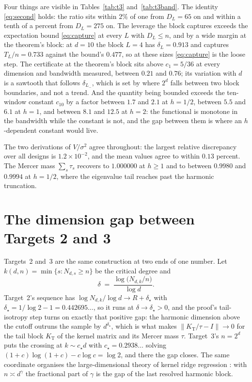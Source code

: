 \documentclass[11pt]{article}
\theoremstyle{definition}
\newcommand{\Kt}{K_{\mathrm{T}}}
\newcommand{\numCertMax}{0.76}
\newcommand{\numCertMin}{0.21}
\newcommand{\numRatioMaxHalf}{2.1}
\newcommand{\numRatioMaxOne}{6.1}
\newcommand{\numRatioMaxTwo}{12.5}
\newcommand{\numRatioMinHalf}{1.7}
\newcommand{\numRatioMinOne}{5.5}
\newcommand{\numRatioMinTwo}{8.1}
\newcommand{\numTauHalfMax}{0.9994}
\newcommand{\numTauHalfMin}{0.9980}
\newcommand{\numVgapMax}{1.2\times10^{-2}}
\newcommand{\numVmeanGapMax}{0.13}
\begin{document}
Four things are visible in Tables~\ref{tab:t3} and~\ref{tab:t3band}. The identity \eqref{eq:second}
holds: the ratio sits within $2\%$ of one from $D_L=65$ on and within a tenth of a percent from
$D_L=275$ on. The leverage the block captures exceeds the expectation bound \eqref{eq:capture} at
every $L$ with $D_L\le n$, and by a wide margin at the theorem's block: at $d=10$ the block $L=4$ has
$\delta_L=0.913$ and captures $T_L/n=0.733$ against the bound's $0.477$, so at these sizes
\eqref{eq:capture} is the loose step. The certificate at the theorem's block sits above $c_1=5/36$
at every dimension and bandwidth measured, between $\numCertMin$ and $\numCertMax$; its variation
with $d$ is a sawtooth that follows $\delta_{L_-}$, which is set by where $2^d$ falls between two
block boundaries, and not a trend. And the quantity being bounded exceeds the ten-window constant
$c_{10}$ by a factor between $\numRatioMinHalf$ and $\numRatioMaxHalf$ at $h=1/2$, between
$\numRatioMinOne$ and $\numRatioMaxOne$ at $h=1$, and between $\numRatioMinTwo$ and
$\numRatioMaxTwo$ at $h=2$: the functional is monotone in the bandwidth while the constant is not,
and the gap between them is where an $h$-dependent constant would live.

The two derivations of $V/\sigma^2$ agree throughout: the largest relative discrepancy over all
designs is $\numVgapMax$, and the mean values agree to within $\numVmeanGapMax$ percent. The Mercer mass
$\sum_s\tau_s$ recovers to $1.000000$ at $h\ge1$ and to between $\numTauHalfMin$ and
$\numTauHalfMax$ at $h=1/2$, where the eigenvalue tail reaches past the harmonic truncation.

\section{The dimension gap between Targets 2 and 3}\label{sec:gap}

Targets~2 and~3 are the same construction at two ends of one number. Let $k(d,n)=\min\{s:N_{d,s}\ge n\}$
be the critical degree and
\[
\delta \;=\; \frac{\log\big(N_{d,k}/n\big)}{\log d}.
\]
Target~2's sequence has $\log N_{d,k}/\log d \to R+\delta_\star$ with
$\delta_\star = 1/\log2-1=0.442695\ldots$, so it runs at $\delta\to\delta_\star>0$, and the proof's
tail-isotropy step turns on exactly that positive gap: the harmonic dimension above the cutoff
outruns the sample by $d^{\delta_\star}$, which is what makes $\|\Kt/\tau-I\|\to0$ for the tail
block $\Kt$ of the kernel matrix and its Mercer mass $\tau$. Target~3's $n=2^d$ puts the crossing at
$k\sim c_\star d$ with $c_\star=0.2938\ldots$ solving $(1+c)\log(1+c)-c\log c=\log2$, and there the
gap closes. The same coordinate organises the large-dimensional theory of kernel ridge regression
\cite{Ghorbani,Misiakiewicz,LuLinXiaHuang}: with $n\asymp d^\gamma$ the fractional part of $\gamma$
is the gap of the last resolved harmonic block.
\end{document}
